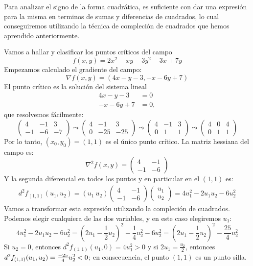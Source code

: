 Para analizar el signo de la forma cuadrática, es suficiente con dar una expresión para la misma en terminos de sumas y diferencias de cuadrados, lo cual conseguiremos utilizando la técnica de compleción de cuadrados que hemos aprendido anteriormente.
%
\begin{ejemplo}
Vamos a hallar y clasificar los puntos críticos del campo
\[
f(x,y)=2x^2-xy-3y^2-3x+7y
\]
Empezamos calculado el gradiente del campo:
\[
\nabla f(x,y) =(4x-y-3,-x-6y+7)
\]
El punto crítico es la solución del sistema lineal
\begin{align*}
4x-y-3&=0\\
-x-6y+7&=0,
\end{align*}
que resolvemos fácilmente:
\[
\begin{pmatrix}
4 & -1 & 3\\
-1 & -6 & -7
\end{pmatrix}\leadsto
\begin{pmatrix}
4 & -1 & 3\\
0 & -25 & -25
\end{pmatrix}\leadsto
\begin{pmatrix}
4 & -1 & 3\\
0 & 1 & 1
\end{pmatrix}\leadsto
\begin{pmatrix}
4 & 0 & 4\\
0 & 1 & 1
\end{pmatrix}
\]
Por lo tanto, $(x_0,y_0)=(1,1)$ es el único punto crítico.
La matriz hessiana del campo es:
\[
\nabla^2f(x,y)=
\begin{pmatrix}
4 & -1 \\
-1 & -6
\end{pmatrix}
\]
Y la segunda diferencial en todos los puntos y en particular en el $(1,1)$ es:
\begin{multline*}
d^2f_{(1,1)}(u_1,u_2)=(u_1\ u_2)
\begin{pmatrix}
4 & -1 \\
-1 & -6
\end{pmatrix}
\begin{pmatrix}
u_1 \\
u_2
\end{pmatrix}=4u_1^2-2u_1u_2-6u_2^2
\end{multline*}
Vamos a transformar esta expresión utilizando la compleción de cuadrados.
Podemos elegir cualquiera de las dos variables, y en este caso elegiremos $u_1$:
\[
4u_1^2-2u_1u_2-6u_2^2=
(2u_1-\frac12u_2)^2-\frac14u_2^2-6u_2^2
=(2u_1-\frac12u_2)^2-\frac{25}4u_2^2
\]
Si $u_2=0$, entonces $d^2f_{(1,1)}(u_1,0)=4u_1^2>0$ y si $2u_1=\frac{u_2}2$, entonces $d^2f_{(1,1)}(u_1,u_2)=\frac{-25}4u_2^2< 0$;
en consecuencia, el punto $(1,1)$ es un punto silla.\fej
\end{ejemplo}

